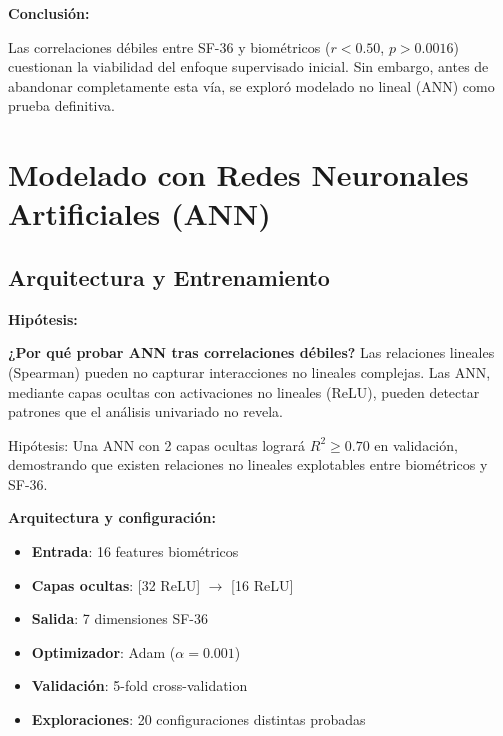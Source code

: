 \documentclass[12pt,letterpaper,twoside]{report}
\begin{document}
\begin{calculobox}
\begin{conclusionbox}
\textbf{Conclusión:}

Las correlaciones débiles entre SF-36 y biométricos ($r < 0.50$, $p > 0.0016$) cuestionan la viabilidad del enfoque supervisado inicial. Sin embargo, antes de abandonar completamente esta vía, se exploró modelado no lineal (ANN) como prueba definitiva.
\end{conclusionbox}

\section{Modelado con Redes Neuronales Artificiales (ANN)}

\subsection{Arquitectura y Entrenamiento}

\begin{hipotesisbox}
\textbf{Hipótesis:}

\textbf{¿Por qué probar ANN tras correlaciones débiles?} Las relaciones lineales (Spearman) pueden no capturar interacciones no lineales complejas. Las ANN, mediante capas ocultas con activaciones no lineales (ReLU), pueden detectar patrones que el análisis univariado no revela.

Hipótesis: Una ANN con 2 capas ocultas logrará $R^2 \geq 0.70$ en validación, demostrando que existen relaciones no lineales explotables entre biométricos y SF-36.
\end{hipotesisbox}

\begin{estadisticobox}
\textbf{Arquitectura y configuración:}

\begin{itemize}[noitemsep]
    \item \textbf{Entrada}: 16 features biométricos
    \item \textbf{Capas ocultas}: [32 ReLU] $\to$ [16 ReLU]
    \item \textbf{Salida}: 7 dimensiones SF-36
    \item \textbf{Optimizador}: Adam ($\alpha=0.001$)
    \item \textbf{Validación}: 5-fold cross-validation
    \item \textbf{Exploraciones}: 20 configuraciones distintas probadas
\end{itemize}
\end{estadisticobox}


\end{calculobox}
\end{document}
